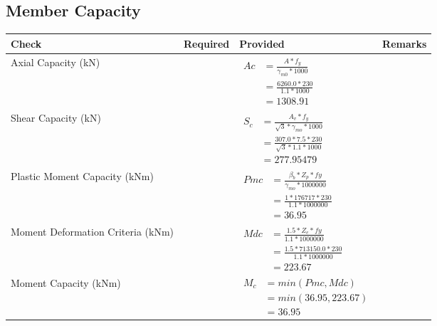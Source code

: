 \documentclass{article}%
\begin{document}
\subsection{Member Capacity}%
\label{subsec:MemberCapacity}%
\renewcommand{\arraystretch}{1.2}%
\begin{longtable}{|p{4cm}|p{5cm}|p{5.5cm}|p{1.5cm}|}%
\hline%
\rowcolor{OsdagGreen}%
Check&Required&Provided&Remarks\\%
\hline%
\endhead%
\hline%
Axial Capacity (kN)&&$\begin{aligned} Ac &=\frac{A*f_y}{\gamma_{m0} *1000}\\ &=\frac{6260.0*230}{1.1* 1000}\\ &=1308.91\end{aligned}$&\\%
\hline%
Shear Capacity (kN)&&$\begin{aligned} S_c &= \frac{A_v*f_y}{\sqrt{3}*\gamma_{mo} *1000}\\ &=\frac{307.0*7.5*230}{\sqrt{3}*1.1 *1000}\\ &=277.95479\end{aligned}$&\\%
\hline%
Plastic Moment Capacity (kNm)&&$\begin{aligned} Pmc &= \frac{\beta_b * Z_p *fy}{\gamma_{mo} * 1000000}\\ &=\frac{1*176717*230}{1.1 * 1000000}\\ &=36.95\end{aligned}$&\\%
\hline%
Moment Deformation Criteria (kNm)&&$\begin{aligned} Mdc &= \frac{1.5 *Z_e *fy}{1.1 * 1000000}\\ &= \frac{1.5 *713150.0*230}{1.1 * 1000000}\\ &= 223.67\end{aligned}$&\\%
\hline%
Moment Capacity (kNm)&&$\begin{aligned} M_c &= min(Pmc,Mdc)\\ &=min(36.95,223.67)\\ &=36.95\end{aligned}$&\\%
\hline%
\end{longtable}

%
\newpage%
\end{document}
